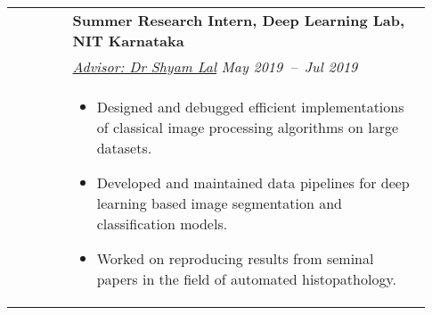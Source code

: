 \documentclass[letterpaper, 10pt, oneside]{article}
\newcommand{\bdit}[1]{{\textbf{#1}}}
\begin{document}
\begin{longtable}{@{} p{0.13\linewidth} p{0.8\linewidth}}
                         & \bdit{Summer Research Intern, Deep Learning Lab, NIT Karnataka}                                                                                                                 \\
                         & \textsl{\href{https://ece.nitk.ac.in/faculty/shyam-lal}{Advisor: Dr Shyam Lal}} \hfill \hspace{-3em} \textsl{May 2019\ --\ Jul 2019}                                            \\
                         & \parbox{0.8\textwidth}{                                                                                                                                                         %
        \begin{itemize}[leftmargin=*, itemsep=-0.88ex, topsep=-0.88ex]
            \item Designed and debugged efficient implementations of classical image processing algorithms on large datasets.
            \item Developed and maintained data pipelines for deep learning based image segmentation and classification models.
            \item Worked on reproducing results from seminal papers in the field of automated histopathology.
        \end{itemize}
    }
    \\
    \\


\end{longtable}
\end{document}
